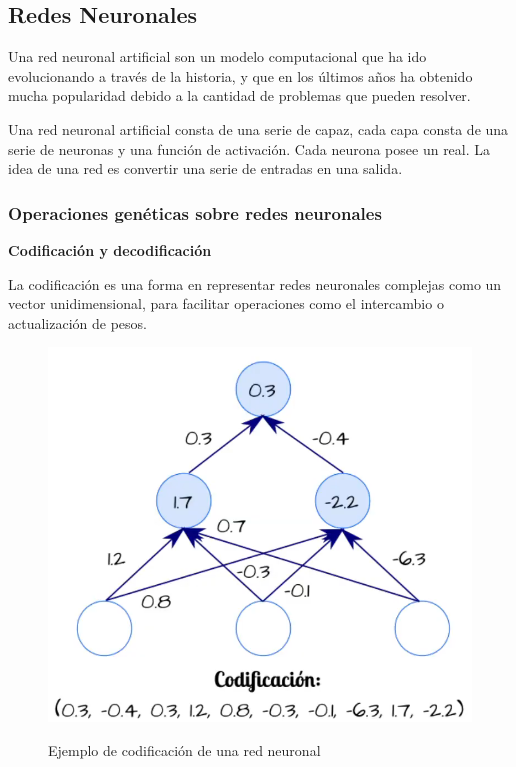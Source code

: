 \documentclass[twocolumn,spanish]{revtex4-1}
\begin{document}
\subsection{Redes Neuronales}
Una red neuronal artificial son un modelo computacional que ha ido evolucionando a través de la historia, y que en los últimos años ha obtenido mucha popularidad debido a la cantidad de problemas que pueden resolver.

Una red neuronal artificial consta de una serie de capaz, cada capa consta de una serie de neuronas y una función de activación. Cada neurona posee un real. La idea de una red es convertir una serie de entradas en una salida. 

\subsubsection{Operaciones genéticas sobre redes neuronales}\label{sec:codificacion}

\textbf{Codificación y decodificación}

La codificación es una forma en representar redes neuronales complejas como un vector unidimensional, para facilitar operaciones como el intercambio o actualización de pesos. 

\begin{figure}[ht]
    \centering
    \includegraphics[width=0.9\linewidth]{images/codificacion.png}
    \begin{quote}
    \caption{Ejemplo de codificación de una red neuronal 
    \protect\cite{profa}}
    \end{quote}
    \label{fig:condificacion}
\end{figure}
\end{document}
